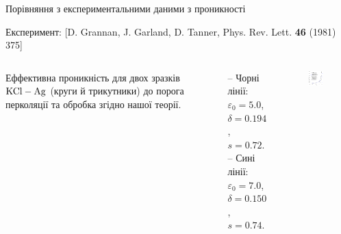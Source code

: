 \documentclass[10pt]{beamer}
\begin{document}
\begin{frame}{Порівняння з експериментальними даними з проникності}

    \scriptsize{Експеримент: [D. Grannan, J. Garland, D. Tanner, Phys. Rev. Lett. {\bf 46} (1981) 375]}
    \footnotesize

\begin{columns}[T,onlytextwidth]
    \vspace{10pt}
      Еффективна проникність для двох зразків $\rm KCl-Ag$ (круги й трикутники) до порога перколяції та обробка згідно нашої теорії. 
      
      \vspace{5pt}
      -- Чорні лінії:\\
      $\varepsilon_0 = 5.0$, \\
      $\delta = 0.194$, \\
      $s = 0.72$. \\
      -- Сині лінії:\\
      $\varepsilon_0 = 7.0$, \\
      $\delta = 0.150$, \\
      $s = 0.74$.
      

      \begin{figure}
        \centering
        \includegraphics[width=0.99\textwidth]{images/chen-fin.eps}
      \end{figure}
\end{columns}

\end{frame}
\end{document}
